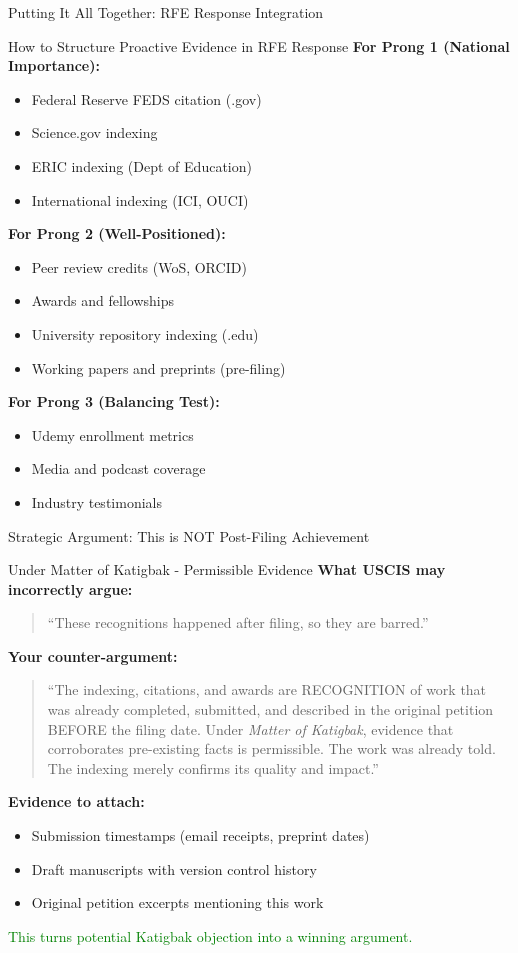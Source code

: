 \documentclass[11pt]{beamer}
\begin{document}
	\begin{frame}{Putting It All Together: RFE Response Integration}
		\scriptsize
		\begin{block}{How to Structure Proactive Evidence in RFE Response}
			\textbf{For Prong 1 (National Importance):}
			\begin{itemize}
				\item Federal Reserve FEDS citation (.gov)
				\item Science.gov indexing
				\item ERIC indexing (Dept of Education)
				\item International indexing (ICI, OUCI)
			\end{itemize}
			\textbf{For Prong 2 (Well-Positioned):}
			\begin{itemize}
				\item Peer review credits (WoS, ORCID)
				\item Awards and fellowships
				\item University repository indexing (.edu)
				\item Working papers and preprints (pre-filing)
			\end{itemize}
			\textbf{For Prong 3 (Balancing Test):}
			\begin{itemize}
				\item Udemy enrollment metrics
				\item Media and podcast coverage
				\item Industry testimonials
			\end{itemize}
		\end{block}
	\end{frame}
	
	\begin{frame}{Strategic Argument: This is NOT Post-Filing Achievement}
		\scriptsize
		\begin{block}{Under Matter of Katigbak - Permissible Evidence}
			\textbf{What USCIS may incorrectly argue:}
			\begin{quote}
				``These recognitions happened after filing, so they are barred.''
			\end{quote}
			\textbf{Your counter-argument:}
			\begin{quote}
				``The indexing, citations, and awards are RECOGNITION of work that was already completed, submitted, and described in the original petition BEFORE the filing date. Under \textit{Matter of Katigbak}, evidence that corroborates pre-existing facts is permissible. The work was already told. The indexing merely confirms its quality and impact.''
			\end{quote}
			\textbf{Evidence to attach:}
			\begin{itemize}
				\item Submission timestamps (email receipts, preprint dates)
				\item Draft manuscripts with version control history
				\item Original petition excerpts mentioning this work
			\end{itemize}
			\textcolor{green}{This turns potential Katigbak objection into a winning argument.}
		\end{block}
	\end{frame}
	
\end{document}
